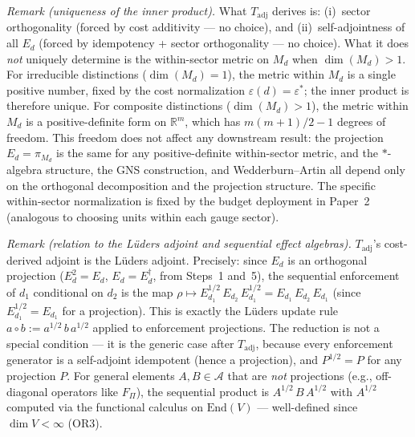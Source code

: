 \documentclass[11pt]{article}
\theoremstyle{remark}
\begin{document}
\begin{tcolorbox}[apfbox, title={Theorem $T_{\mathrm{adj}}$ --- Bridge Step 1: $*$-Involution from Cost Symmetry}]
\smallskip\noindent\textit{Remark (uniqueness of the inner product).}  What $T_{\mathrm{adj}}$ derives is: (i)~sector orthogonality (forced by cost additivity --- no choice), and (ii)~self-adjointness of all $E_d$ (forced by idempotency + sector orthogonality --- no choice).  What it does \emph{not} uniquely determine is the within-sector metric on $M_d$ when $\dim(M_d) > 1$.  For irreducible distinctions ($\dim(M_d) = 1$), the metric within $M_d$ is a single positive number, fixed by the cost normalization $\varepsilon(d) = \varepsilon^*$; the inner product is therefore unique.  For composite distinctions ($\dim(M_d) > 1$), the metric within $M_d$ is a positive-definite form on $\mathbb{R}^m$, which has $m(m+1)/2 - 1$ degrees of freedom.  This freedom does not affect any downstream result: the projection $E_d = \pi_{M_d}$ is the same for any positive-definite within-sector metric, and the $*$-algebra structure, the GNS construction, and Wedderburn--Artin all depend only on the orthogonal decomposition and the projection structure.  The specific within-sector normalization is fixed by the budget deployment in Paper~2 (analogous to choosing units within each gauge sector).

\smallskip\noindent\textit{Remark (relation to the L\"uders adjoint and sequential effect algebras).}
$T_{\mathrm{adj}}$'s cost-derived adjoint is the L\"uders adjoint.  Precisely: since $E_d$ is an orthogonal projection ($E_d^2 = E_d$, $E_d = E_d^\dagger$, from Steps~1 and~5), the sequential enforcement of $d_1$ conditional on $d_2$ is the map $\rho \mapsto E_{d_1}^{1/2}\, E_{d_2}\, E_{d_1}^{1/2} = E_{d_1}\, E_{d_2}\, E_{d_1}$ (since $E_{d_1}^{1/2} = E_{d_1}$ for a projection).  This is exactly the L\"uders update rule $a \circ b := a^{1/2}\, b\, a^{1/2}$ applied to enforcement projections.  The reduction is not a special condition --- it is the generic case after $T_{\mathrm{adj}}$, because every enforcement generator is a self-adjoint idempotent (hence a projection), and $P^{1/2} = P$ for any projection $P$.  For general elements $A, B \in \mathcal{A}$ that are \emph{not} projections (e.g., off-diagonal operators like $F_\Pi$), the sequential product is $A^{1/2}\, B\, A^{1/2}$ with $A^{1/2}$ computed via the functional calculus on $\mathrm{End}(V)$ --- well-defined since $\dim V < \infty$ (OR3).


\end{tcolorbox}
\end{document}
